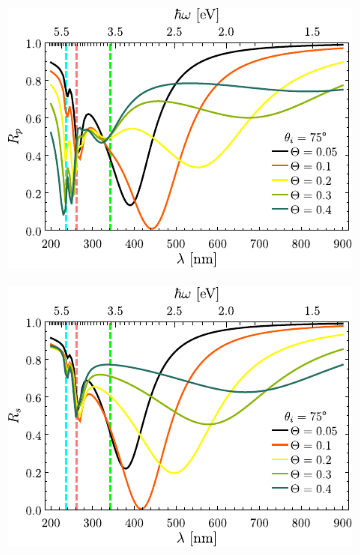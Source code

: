 \begin{figure}[h!]\centering\hspace*{-1.5em}
	\begin{subfigure}{.01\linewidth}\caption{}\label{sfig:R-ATR10-cutp}\vspace{4.75cm}\end{subfigure}
	\begin{subfigure}{.45\linewidth}\hspace*{-1.5em}
	\includegraphics[scale=.98]{2-Resultados/figs/2-Wp10ThetaVar/cut_angle_75_p.pdf}\end{subfigure}
	\begin{subfigure}{.01\linewidth}\caption{}\label{sfig:R-ATR10-cuts}\vspace{4.75cm}\end{subfigure}\hspace*{-1.em}
	\begin{subfigure}{.45\linewidth}\centering
	\includegraphics[scale=.98 ]{2-Resultados/figs/2-Wp10ThetaVar/cut_angle_75_s.pdf}\end{subfigure}\vspace*{-.5em}

\end{figure}
